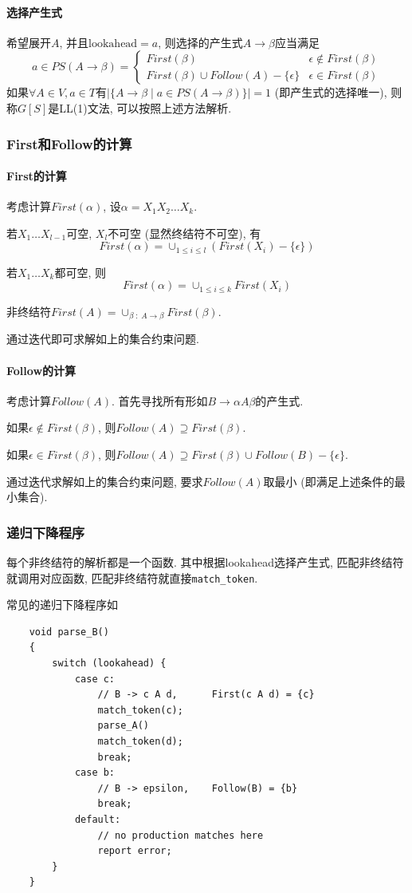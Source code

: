 \documentclass{ctexart}
\begin{document}
\paragraph{选择产生式} 希望展开$A$, 并且$\text{lookahead} = a$, 则选择的产生式$A \to \beta$应当满足\[
    a \in PS(A \to \beta) = \begin{cases}
        First(\beta) & \epsilon \not\in First(\beta)\\
        First(\beta) \cup Follow(A) - \{\epsilon\} & \epsilon \in First(\beta)
    \end{cases} \]
    如果$\forall A \in V, a \in T$有$\Big|\{A \to \beta \;|\; a \in PS(A \to \beta)\}\Big| = 1$ (即产生式的选择唯一),
    则称$G[S]$是LL(1)文法, 可以按照上述方法解析.
\subsubsection{First和Follow的计算}
\paragraph{First的计算} 考虑计算$First(\alpha)$, 设$\alpha = X_1 X_2 \ldots X_k$.\par
    若$X_1\ldots X_{l-1}$可空, $X_l$不可空 (显然终结符不可空), 有\[
        First(\alpha) = \cup_{1 \le i \le l} \left( First(X_i) - \{\epsilon\} \right) \]\par
    若$X_1 \ldots X_k$都可空, 则\[
        First(\alpha) = \cup_{1 \le i \le k} First(X_i)\]\par
    非终结符$First(A) = \cup_{\beta\;:\; A \to \beta} First(\beta)$.\par
    通过迭代即可求解如上的集合约束问题.
\paragraph{Follow的计算} 考虑计算$Follow(A)$. 首先寻找所有形如$B \to \alpha A \beta$的产生式.\par
    如果$\epsilon \not\in First(\beta)$, 则$Follow(A) \supseteq First(\beta)$.\par
    如果$\epsilon \in First(\beta)$, 则$Follow(A) \supseteq First(\beta) \cup Follow(B) - \{\epsilon\}$.\par
    通过迭代求解如上的集合约束问题, 要求$Follow(A)$取最小 (即满足上述条件的最小集合).
\subsubsection{递归下降程序} 每个非终结符的解析都是一个函数.
    其中根据lookahead选择产生式, 匹配非终结符就调用对应函数, 匹配非终结符就直接\texttt{match\_token}.\par
    常见的递归下降程序如\begin{verbatim}
    void parse_B()
    {
        switch (lookahead) {
            case c: 
                // B -> c A d,      First(c A d) = {c}
                match_token(c); 
                parse_A()
                match_token(d);
                break;
            case b: 
                // B -> epsilon,    Follow(B) = {b}
                break;
            default:
                // no production matches here
                report error;
        }
    }\end{verbatim}
\end{document}
